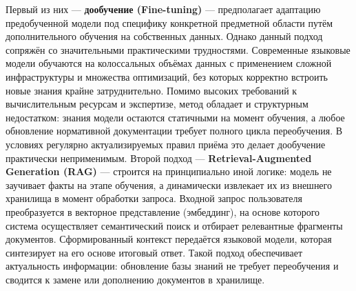\documentclass{article}
\begin{document}
\noindent Первый из них --- \textbf{дообучение (Fine-tuning)} --- предполагает адаптацию предобученной модели под специфику конкретной предметной области путём дополнительного обучения на собственных данных. Однако данный подход сопряжён со значительными практическими трудностями. Современные языковые модели обучаются на колоссальных объёмах данных с применением сложной инфраструктуры и множества оптимизаций, без которых корректно встроить новые знания крайне затруднительно. Помимо высоких требований к вычислительным ресурсам и экспертизе, метод обладает и структурным недостатком: знания модели остаются статичными на момент обучения, а любое обновление нормативной документации требует полного цикла переобучения. В условиях регулярно актуализируемых правил приёма это делает дообучение практически неприменимым.
Второй подход --- \textbf{Retrieval-Augmented Generation (RAG)} --- строится на принципиально иной логике: модель не заучивает факты на этапе обучения, а динамически извлекает их из внешнего хранилища в момент обработки запроса. Входной запрос пользователя преобразуется в векторное представление (эмбеддинг), на основе которого система осуществляет семантический поиск и отбирает релевантные фрагменты документов. Сформированный контекст передаётся языковой модели, которая синтезирует на его основе итоговый ответ. Такой подход обеспечивает актуальность информации: обновление базы знаний не требует переобучения и сводится к замене или дополнению документов в хранилище.

\end{document}
